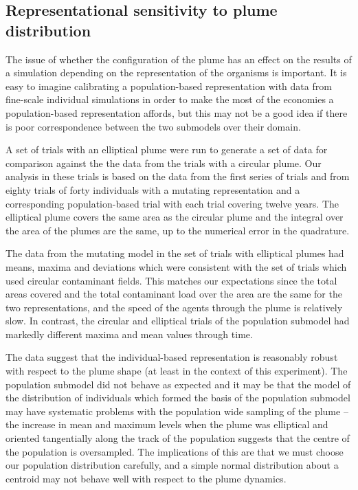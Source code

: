 \documentclass{article}
\begin{document}
\subsection{Representational sensitivity to plume distribution\label{Plume1}}

The issue of whether the configuration of the plume has an effect on the
results of a simulation depending on the representation of the organisms is
important. It is easy to imagine calibrating a population-based representation
with data from fine-scale individual simulations in order to make the most of
the economies a population-based representation affords, but this may not be a
good idea if there is poor correspondence between the two submodels over their
domain.

A set of trials with an elliptical plume were run to generate a set of data
for comparison against the the data from the trials with a circular plume. Our
analysis in these trials is based on the data from the first series of trials
and from eighty trials of forty individuals with a mutating representation and
a corresponding population-based trial with each trial covering twelve years.
The elliptical plume covers the same area as the circular plume and the
integral over the area of the plumes are the same, up to the numerical error
in the quadrature.

The data from the mutating model in the set of trials with elliptical plumes
had means, maxima and deviations which were consistent with the set of trials
which used circular contaminant fields. This matches our expectations since
the total areas covered and the total contaminant load over the area are the
same for the two representations, and the speed of the agents through the
plume is relatively slow. In contrast, the circular and elliptical trials of
the population submodel had markedly different maxima and mean values through
time.

The data suggest that the individual-based representation is reasonably robust
with respect to the plume shape (at least in the context of this experiment).
The population submodel did not behave as expected and it may be that the
model of the distribution of individuals which formed the basis of the
population submodel may have systematic problems with the population wide
sampling of the plume -- the increase in mean and maximum levels when the
plume was elliptical and oriented tangentially along the track of the
population suggests that the centre of the population is oversampled. The
implications of this are that we must choose our population distribution
carefully, and a simple normal distribution about a centroid may not behave
well with respect to the plume dynamics.
\end{document}
